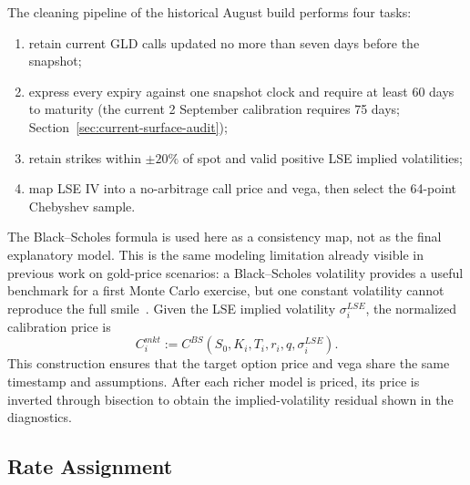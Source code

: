 The cleaning pipeline of the historical August build performs four tasks:

\begin{enumerate}[leftmargin=8mm, itemsep=2pt]
    \item retain current GLD calls updated no more than seven days before the snapshot;
    \item express every expiry against one snapshot clock and require at least 60 days to maturity (the current 2 September calibration requires 75 days; Section~\ref{sec:current-surface-audit});
    \item retain strikes within \(\pm20\%\) of spot and valid positive LSE implied volatilities;
    \item map LSE IV into a no-arbitrage call price and vega, then select the 64-point Chebyshev sample.
\end{enumerate}

The Black--Scholes formula is used here as a consistency map, not as the final explanatory model. This is the same modeling limitation already visible in previous work on gold-price scenarios: a Black--Scholes volatility provides a useful benchmark for a first Monte Carlo exercise, but one constant volatility cannot reproduce the full smile~\cite{team4}. Given the LSE implied volatility \(\sigma_i^{LSE}\), the normalized calibration price is
\begin{equation}
    C_i^{mkt}:=C^{BS}(S_0,K_i,T_i,r_i,q,\sigma_i^{LSE}).
\end{equation}
This construction ensures that the target option price and vega share the same timestamp and assumptions. After each richer model is priced, its price is inverted through bisection to obtain the implied-volatility residual shown in the diagnostics.
\subsection{Rate Assignment}

